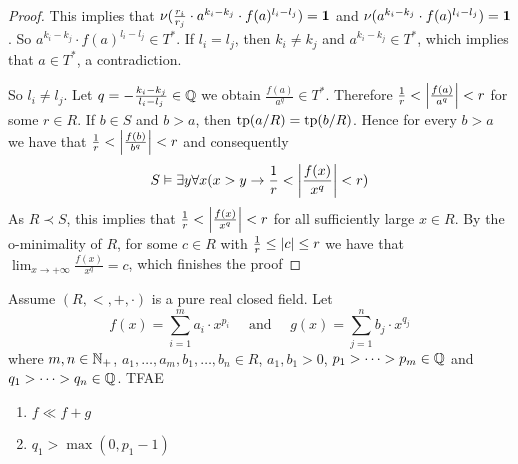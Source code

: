 \documentclass[11pt]{article}
\begin{document}
\begin{proof}
This implies that \(\nu(\frac{r_i}{r_j}\cdot a^{k_i-k_j}\cdot f(a)^{l_i-l_j})=\operatorname{\textbf{1}}\)
and \(\nu(a^{k_i-k_j}\cdot f(a)^{l_i-l_j})=\operatorname{\textbf{1}}\). So \(a^{k_i-k_j}\cdot f(a)^{l_i-l_j}\in T^*\). If \(l_i=l_j\),
then \(k_i\neq k_j\) and \(a^{k_i-k_j}\in T^*\), which implies that \(a\in T^*\), a contradiction.

So \(l_i\neq l_j\). Let \(q=-\frac{k_i-k_j}{l_i-l_j}\in\mathbb{Q}\) we obtain \(\frac{f(a)}{a^q}\in T^*\).
Therefore \(\frac{1}{r}<\abs{\frac{f(a)}{a^q}}<r\) for some \(r\in R\). If \(b\in S\) and \(b>a\),
then \(\operatorname{tp}(a/R)=\operatorname{tp}(b/R)\). Hence for every \(b>a\) we have
that \(\frac{1}{r}<\abs{\frac{f(b)}{b^q}}<r\) and consequently
\begin{equation*}
S\vDash\exists y\forall x(x>y\to\frac{1}{r}<\abs{\frac{f(x)}{x^q}}<r)
\end{equation*}
As \(R\prec S\), this implies that \(\frac{1}{r}<\abs{\frac{f(x)}{x^q}}<r\) for all sufficiently
large \(x\in R\). By the o-minimality of \(R\), for some \(c\in R\) with \(\frac{1}{r}\le\abs{c}\le r\)
we have that \(\lim_{x\to+\infty}\frac{f(x)}{x^q}=c\), which finishes the proof
\end{proof}

\begin{theorem}[]
\label{3.5.6}
Assume \((R,<,+,\cdot)\) is a pure real closed field. Let
\begin{equation*}
f(x)=\sum_{i=1}^ma_i\cdot x^{p_i}\quad\text{ and }\quad g(x)=\sum_{j=1}^nb_j\cdot x^{q_j}
\end{equation*}
where \(m,n\in\mathbb{N}_+\), \(a_1,\dots,a_m,b_1,\dots,b_n\in R\), \(a_1,b_1>0\), \(p_1>\dots>p_m\in\mathbb{Q}\) and \(q_1>\dots>q_n\in\mathbb{Q}\). TFAE
\begin{enumerate}
\item \(f\ll f+g\)
\item \(q_1>\max(0,p_1-1)\)
\end{enumerate}
\end{theorem}
\end{document}
